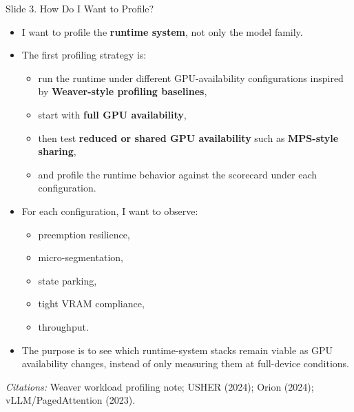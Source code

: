 \documentclass[aspectratio=169]{beamer}
\newcommand{\slidecite}[1]{\vspace{0.35em}\par{\tiny\raggedright\textit{Citations: }#1\par}}
\begin{document}
\begin{frame}[t,shrink=8]{Slide 3. How Do I Want to Profile?}
\footnotesize
\begin{itemize}
  \item I want to profile the \textbf{runtime system}, not only the model family.
  \item The first profiling strategy is:
  \begin{itemize}
    \item run the runtime under different GPU-availability configurations inspired by \textbf{Weaver-style profiling baselines},
    \item start with \textbf{full GPU availability},
    \item then test \textbf{reduced or shared GPU availability} such as \textbf{MPS-style sharing},
    \item and profile the runtime behavior against the scorecard under each configuration.
  \end{itemize}
  \item For each configuration, I want to observe:
  \begin{itemize}
    \item preemption resilience,
    \item micro-segmentation,
    \item state parking,
    \item tight VRAM compliance,
    \item throughput.
  \end{itemize}
  \item The purpose is to see which runtime-system stacks remain viable as GPU availability changes, instead of only measuring them at full-device conditions.
\end{itemize}
\slidecite{Weaver workload profiling note; USHER (2024); Orion (2024); vLLM/PagedAttention (2023).}
\end{frame}
\end{document}
